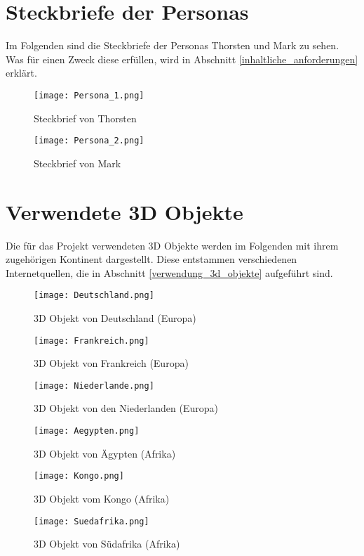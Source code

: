 \section{Steckbriefe der Personas}\label{persona}
Im Folgenden sind die Steckbriefe der Personas Thorsten und Mark zu sehen. Was für einen Zweck diese erfüllen, wird in Abschnitt \ref{inhaltliche_anforderungen} erklärt.

\begin{figure}[!htb]
  \texttt{[image: Persona\_1.png]}
  \caption{Steckbrief von Thorsten}\label{fig:persona_thorsten}
\endminipage\hfill
{}
  \texttt{[image: Persona\_2.png]}
  \caption{Steckbrief von Mark}\label{fig:persona_mark}
\endminipage\hfill
\end{figure}

\section{Verwendete 3D Objekte}
Die für das Projekt verwendeten 3D Objekte werden im Folgenden mit ihrem zugehörigen Kontinent dargestellt. Diese entstammen verschiedenen Internetquellen, die in Abschnitt \ref{verwendung_3d_objekte} aufgeführt sind.

\begin{figure}[!htb]
  \texttt{[image: Deutschland.png]}
  \caption{3D Objekt von Deutschland (Europa)}\label{fig:deutschland}
\endminipage\hfill
{}
  \texttt{[image: Frankreich.png]}
  \caption{3D Objekt von Frankreich (Europa)}\label{fig:frankreich}
\endminipage\hfill
\end{figure}

\begin{figure}[!htb]
  \texttt{[image: Niederlande.png]}
  \caption{3D Objekt von den Niederlanden (Europa)}\label{fig:niederlande}
\endminipage\hfill
{}
  \texttt{[image: Aegypten.png]}
  \caption{3D Objekt von Ägypten (Afrika)}\label{fig:aegypten}
\endminipage\hfill
\end{figure}

\begin{figure}[!htb]
  \texttt{[image: Kongo.png]}
  \caption{3D Objekt vom Kongo (Afrika)}\label{fig:kongo}
\endminipage\hfill
{}
  \texttt{[image: Suedafrika.png]}
  \caption{3D Objekt von Südafrika (Afrika)}\label{fig:suedafrika}
\endminipage\hfill
\end{figure}

